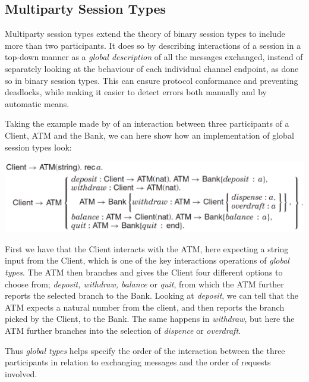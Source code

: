 
\subsection{Multiparty Session Types}
Multiparty session types extend the theory of binary session types to include more than two participants. It does so by describing interactions of a session in a top-down manner as a \textit{global description} of all the messages exchanged, instead of separately looking at the behaviour of each individual channel endpoint, as done so in binary session types. This can ensure protocol conformance and preventing deadlocks, while making it easier to detect errors both manually and by automatic means.  %

Taking the example made by \citeauthor{DBLP:journals/csur/HuttelLVCCDMPRT16} of an interaction between three participants of a Client, ATM and the Bank, we can here show how an implementation of global session types look:
\begin{center}
\includegraphics[width=1.0\textwidth, angle=0]{Graphics/Client_ATM.pdf}
\end{center}
First we have that the Client interacts with the ATM, here expecting a string input from the Client, which is one of the key interactions operations of \textit{global types}. The ATM then branches and gives the Client four different options to choose from; \textit{deposit, withdraw, balance} or \textit{quit}, from which the ATM further reports the selected branch to the Bank. Looking at \textit{deposit}, we can tell that the ATM expects a natural number from the client, and then reports the branch picked by the Client, to the Bank. The same happens in \textit{withdraw}, but here the ATM further branches into the selection of \textit{dispence} or \textit{overdraft}.

Thus \textit{global types} helps specify the order of the interaction between the three participants in relation to exchanging messages and the order of requests involved.  \\ 


